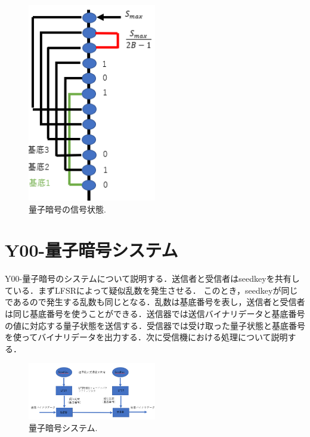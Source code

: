 \documentclass[a4j,twocolumn]{jarticle}
\begin{document}
\begin{figure}[htbp]
        \centering   
        \includegraphics[width=0.5\textwidth]{img/zemi2.png}
        \caption[sample image (png)]{量子暗号の信号状態.}
        \label{Fig:3_2}
    \end{figure}
    
\section{Y00-量子暗号システム}
Y00-量子暗号のシステムについて説明する．送信者と受信者はseedkeyを共有している．まずLFSRによって疑似乱数を発生させる．
このとき，seedkeyが同じであるので発生する乱数も同じとなる．乱数は基底番号を表し，送信者と受信者は同じ基底番号を使うことができる．送信器では送信バイナリデータと基底番号の値に対応する量子状態を送信する．受信器では受け取った量子状態と基底番号を使ってバイナリデータを出力する．次に受信機における処理について説明する．

\begin{figure}[htbp]
        \centering   
        \includegraphics[width=0.5\textwidth]{img/zemi3.png}
        \caption[sample image (png)]{量子暗号システム.}
        \label{fig:4_1}
    \end{figure}
\end{document}
